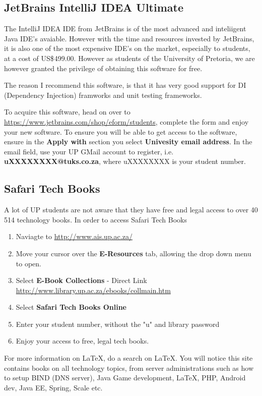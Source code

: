 \documentclass[a4paper,10pt]{article}
\begin{document}
\subsection {JetBrains IntelliJ IDEA Ultimate}
The IntelliJ IDEA IDE from JetBrains is of the most advanced and inteliigent Java IDE's avaiable.  However with the time and resources invested by JetBrains, it is also one of the most expensive IDE's on the market, especially to students, at a cost of US\$ 499.00.  However as students of the University of Pretoria, we are however granted the privilege of obtaining this software for free. 

The reason I recommend this software, is that it has very good support for DI (Dependency Injection) framworks and unit testing frameworks.

To acquire this software, head on over to \url{https://www.jetbrains.com/shop/eform/students}, complete the form and enjoy your new software. To ensure you will be able to get access to the software, ensure in the \textbf{Apply with} section you select \textbf{Univesity email address}. In the email field, use your UP GMail account to register, i.e. \textbf{uXXXXXXXX@tuks.co.za}, where uXXXXXXXX is your student number.

\subsection{Safari Tech Books}
\label{sec:safaritechbooks}
A lot of UP students are not aware that they have free and legal access to over 40 514 technology books. In order to access Safari Tech Books

\begin{enumerate}
\item Naviagte to \url{http://www.ais.up.ac.za/}
\item Move your cursor over the \textbf{E-Resources} tab, allowing the drop down menu to open.
\item Select \textbf{E-Book Collections} - Direct Link \url{http://www.library.up.ac.za/ebooks/collmain.htm}
\item Select \textbf{Safari Tech Books Online}
\item Enter your student number, without the "u" and library password
\item Enjoy your access to free, legal tech books.
\end{enumerate}

For more information on \LaTeX{}, do a search on \LaTeX{}. You will notice this site contains books on all technology topics, from server administrations such as how to setup BIND (DNS server), Java Game development, LaTeX, PHP, Android dev, Java EE, Spring, Scale etc.
\end{document}
